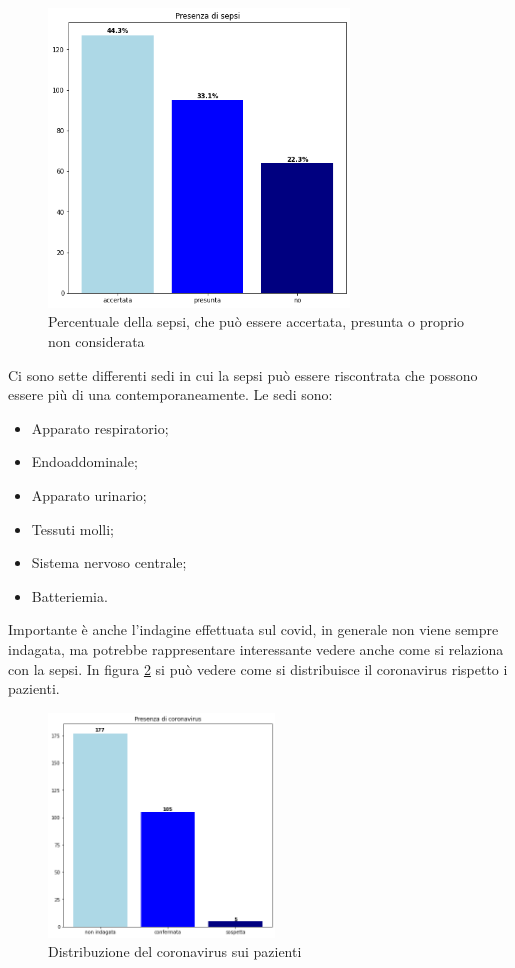 \begin{figure}[h] 
	\centering
	\includegraphics[width=8cm]{capitolo1/sepsi.png}
	\caption{Percentuale della sepsi, che può essere accertata, presunta o proprio non considerata }
	\label{fig:sepsi}
\end{figure}

Ci sono sette differenti sedi in cui la sepsi può essere riscontrata che possono essere più di una contemporaneamente. Le sedi sono:
\begin{itemize}
	\item Apparato respiratorio;
	\item Endoaddominale;
	\item Apparato urinario;
	\item Tessuti molli;
	\item Sistema nervoso centrale;
	\item Batteriemia.
\end{itemize}

Importante è anche l'indagine effettuata sul covid, in generale non viene sempre indagata, ma potrebbe rappresentare interessante vedere anche come si relaziona con la sepsi. In figura  \ref{fig:covid} si può vedere come si distribuisce il coronavirus rispetto i pazienti. 
\begin{figure}[h] 
	\centering
	\includegraphics[width=6cm]{capitolo1/covid.png}
	\caption{Distribuzione del coronavirus sui pazienti}
	\label{fig:covid}
\end{figure}

